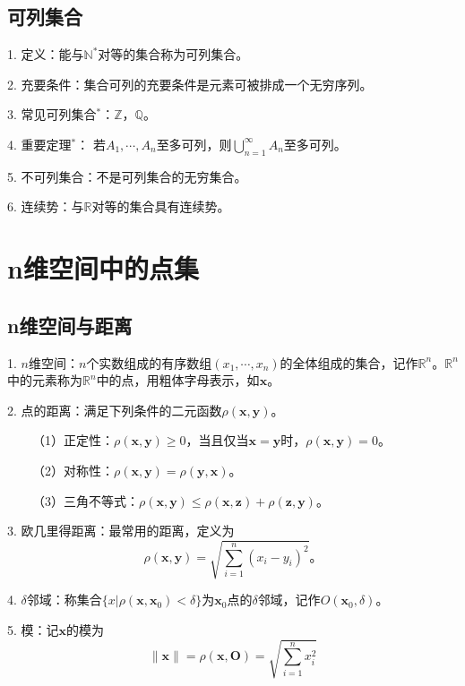 \subsection{可列集合}

1. 定义：能与$\mathbb{N}^*$对等的集合称为可列集合。

2. 充要条件：集合可列的充要条件是元素可被排成一个无穷序列。

3. 常见可列集合$^*$：$\mathbb{Z}$，$\mathbb{Q}$。

4. 重要定理$^*$： 若$A_1,\cdots,A_n$至多可列，则$\bigcup\limits_{n=1}^\infty A_n$至多可列。

5. 不可列集合：不是可列集合的无穷集合。

6. 连续势：与$\mathbb{R}$对等的集合具有连续势。

\section{n维空间中的点集}

\subsection{n维空间与距离}

1. $n$维空间：$n$个实数组成的有序数组$(x_1,\cdots,x_n)$的全体组成的集合，记作$\mathbb{R}^n$。$\mathbb{R}^n$中的元素称为$\mathbb{R}^n$中的点，用粗体字母表示，如$\boldsymbol{x}$。

2. 点的距离：满足下列条件的二元函数$\rho(\boldsymbol{x},\boldsymbol{y})$。

~~~~（1）正定性：$\rho(\boldsymbol{x},\boldsymbol{y})\geqslant 0$，当且仅当$\boldsymbol{x}=\boldsymbol{y}$时，$\rho(\boldsymbol{x},\boldsymbol{y})=0$。

~~~~（2）对称性：$\rho(\boldsymbol{x},\boldsymbol{y})=\rho(\boldsymbol{y},\boldsymbol{x})$。

~~~~（3）三角不等式：$\rho(\boldsymbol{x},\boldsymbol{y})\leqslant \rho(\boldsymbol{x},\boldsymbol{z})+\rho(\boldsymbol{z},\boldsymbol{y})$。

3. 欧几里得距离：最常用的距离，定义为
\begin{equation*}
    \rho(\boldsymbol{x},\boldsymbol{y})=\sqrt{\sum\limits_{i=1}^n(x_i-y_i)^2}。    
\end{equation*}

4. $\delta$邻域：称集合$\{x|\rho(\boldsymbol{x},\boldsymbol{x}_0)<\delta\}$为$\boldsymbol{x}_0$点的$\delta$邻域，记作$O(\boldsymbol{x}_0,\delta)$。

5. 模：记$\boldsymbol{x}$的模为
\begin{equation*}
    \|\boldsymbol{x}\|=\rho(\boldsymbol{x},\boldsymbol{O})=\sqrt{\sum\limits_{i=1}^n x_i^2}
\end{equation*}

